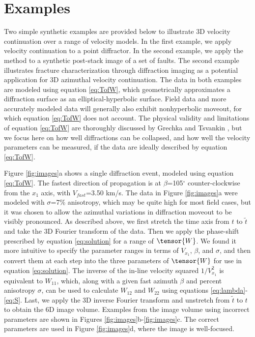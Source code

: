 \section{Examples}
Two simple synthetic examples are provided below to illustrate 3D velocity continuation over a range of velocity models.  
In the first example, we apply velocity continuation to a point diffractor.  
In the second example, we apply the method to a synthetic post-stack image of a set of faults.  
The second example illustrates fracture characterization through diffraction imaging as a potential application for 3D azimuthal velocity continuation.
The data in both examples are modeled using equation \ref{eq:TofW}, which geometrically approximates a diffraction surface as an elliptical-hyperbolic surface.
Field data and more accurately modeled data will generally also exhibit nonhyperbolic moveout, for which equation \ref{eq:TofW} does not account.
The physical validity and limitations of equation \ref{eq:TofW} are thoroughly discussed by Grechka and Tsvankin \cite{GEO63-03-10791092}, but we focus here on how well diffractions can be collapsed, and how well the velocity parameters can be measured, if the data are ideally described by equation \ref{eq:TofW}. 


Figure \ref{fig:images}a shows a single diffraction event, modeled using equation \ref{eq:TofW}.  
The fastest direction of propagation is at $\beta $=105$^{\circ }$ counter-clockwise from the $x_1$ axis, with $V_{fast}$=3.50 km/s.  
The data in Figure \ref{fig:images}a were modeled with $\sigma $=7\% anisotropy, which may be quite high for most field cases, but it was chosen to allow the azimuthal variations in diffraction moveout to be visibly pronounced.  
As described above, we first stretch the time axis from $t$ to $\tilde{t}$ and take the 3D Fourier transform of the data.  
Then we apply the phase-shift prescribed by equation \ref{eq:solution} for a range of $\tensor{W}$.  
We found it more intuitive to specify the parameter ranges in terms of $V_{x_1}$, $\beta $, and $\sigma $, and then convert them at each step into the three parameters of $\tensor{W}$ for use in equation \ref{eq:solution}. 
The inverse of the in-line velocity squared $1/V_{x_1}^2$ is equivalent to $W_{11}$, which, along with a given fast azimuth $\beta $ and percent anisotropy $\sigma $, can be used to calculate $W_{12}$ and $W_{22}$ using equations \ref{eq:lambda}-\ref{eq:S}.
Last, we apply the 3D inverse Fourier transform and unstretch from $\tilde{t}$ to $t$ to obtain the 6D image volume.  
Examples from the image volume using incorrect parameters are shown in Figures \ref{fig:images}b-\ref{fig:images}c.  
The correct parameters are used in Figure \ref{fig:images}d, where the image is well-focused.

